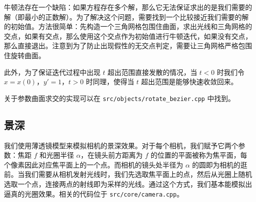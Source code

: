 \documentclass[cn]{report}
\let\t\texttt
\begin{document}
    牛顿法存在一个缺陷：如果方程存在多个解，那么它无法保证求出的是我们需要的解（即最小的正数解）。为了解决这个问题，需要找到一个比较接近我们需要的解的初始值。方法很简单：先构造一个三角网格包围住曲面，求出光线和三角网格的交点，如果有交点，那么使用这个交点作为初始值进行牛顿迭代，如果没有交点，那么直接退出。注意到为了防止出现假性的无交点判定，需要让三角网格严格包围住旋转曲面。

    此外，为了保证迭代过程中出现 $t$ 超出范围直接发散的情况，当 $t < 0$ 时我们令 $x = x(0)$，$y' = 1$，$t > 0$ 时同理，使得当 $t$ 超出范围是能够快速收敛回来。

    关于参数曲面求交的实现可以在 \t{src/objects/rotate\_bezier.cpp} 中找到。

    \subsection{景深}

    我们使用薄透镜模型来模拟相机的景深效果。对于每个相机，我们赋予它两个参数：焦距 $f$ 和光圈半径 $\alpha$，在镜头前方距离为 $f$ 的位置的平面被称为焦平面，每个像素因此对应焦平面上的一个点。而相机的镜头处半径为 $\alpha$ 的圆即为相机的逛前。当我们需要从相机发射光线时，我们先选取焦平面上的点，然后从光圈上随机选取一个点，连接两点的射线即为采样的光线。通过这个方式，我们基本能模拟出逼真的光圈效果。相关的代码位于 \t{src/core/camera.cpp}。
\end{document}
